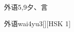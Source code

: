 \begin{entry}{外语}{5,9}{⼣、⾔}
  \begin{phonetics}{外语}{wai4yu3}[][HSK 1]
  \end{phonetics}
\end{entry}
